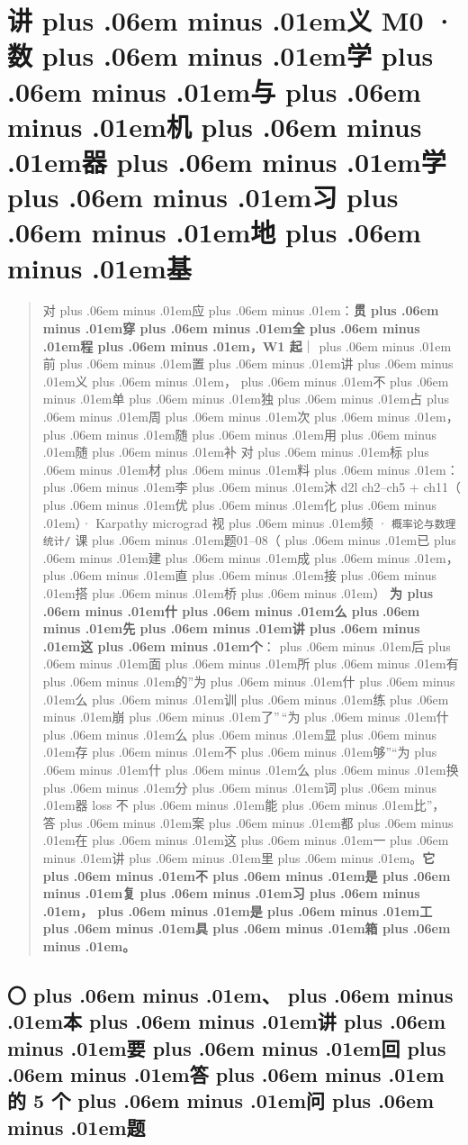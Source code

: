 \documentclass[
]{article}
\newcommand{\passthrough}[1]{#1}
\def\zh#1{{\zhfont #1}}
\def\sym#1{{\symfont #1}}
\def\zhglue{\hskip0pt plus .06em minus .01em}
\begin{document}
\newpage

\section{\zh{讲\zhglue 义} M0 \sym{·} \zh{数\zhglue 学\zhglue 与\zhglue 机\zhglue 器\zhglue 学\zhglue 习\zhglue 地\zhglue 基}}\label{ux8bb2ux4e49-m0-ux6570ux5b66ux4e0eux673aux5668ux5b66ux4e60ux5730ux57fa}

\begin{quote}
\zh{对\zhglue 应\zhglue ：}\textbf{\zh{贯\zhglue 穿\zhglue 全\zhglue 程\zhglue ，}W1 \zh{起}}\zh{｜\zhglue 前\zhglue 置\zhglue 讲\zhglue 义\zhglue ，\zhglue 不\zhglue 单\zhglue 独\zhglue 占\zhglue 周\zhglue 次\zhglue ，\zhglue 随\zhglue 用\zhglue 随\zhglue 补} \zh{对\zhglue 标\zhglue 材\zhglue 料\zhglue ：\zhglue 李\zhglue 沐} d2l ch2--ch5 + ch11\zh{（\zhglue 优\zhglue 化\zhglue ）}\sym{·} Karpathy micrograd \zh{视\zhglue 频} \sym{·} \passthrough{\lstinline!概率论与数理统计/!} \zh{课\zhglue 题}01--08\zh{（\zhglue 已\zhglue 建\zhglue 成\zhglue ，\zhglue 直\zhglue 接\zhglue 搭\zhglue 桥\zhglue ）} \textbf{\zh{为\zhglue 什\zhglue 么\zhglue 先\zhglue 讲\zhglue 这\zhglue 个}}\zh{：\zhglue 后\zhglue 面\zhglue 所\zhglue 有\zhglue 的}''\zh{为\zhglue 什\zhglue 么\zhglue 训\zhglue 练\zhglue 崩\zhglue 了}''\,``\zh{为\zhglue 什\zhglue 么\zhglue 显\zhglue 存\zhglue 不\zhglue 够}''``\zh{为\zhglue 什\zhglue 么\zhglue 换\zhglue 分\zhglue 词\zhglue 器} loss \zh{不\zhglue 能\zhglue 比}''\zh{，} \zh{答\zhglue 案\zhglue 都\zhglue 在\zhglue 这\zhglue 一\zhglue 讲\zhglue 里\zhglue 。}\textbf{\zh{它\zhglue 不\zhglue 是\zhglue 复\zhglue 习\zhglue ，\zhglue 是\zhglue 工\zhglue 具\zhglue 箱\zhglue 。}}
\end{quote}

\subsection{\zh{〇\zhglue 、\zhglue 本\zhglue 讲\zhglue 要\zhglue 回\zhglue 答\zhglue 的} 5 \zh{个\zhglue 问\zhglue 题}}\label{ux672cux8bb2ux8981ux56deux7b54ux7684-5-ux4e2aux95eeux9898}
\end{document}
